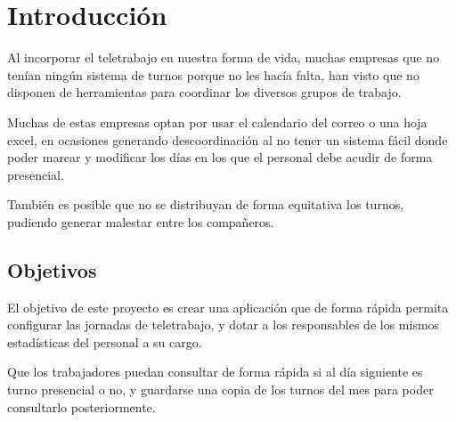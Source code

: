 \documentclass[11pt,spanish,listoffigures,listoftables]{tfgetsinf}
\begin{document}

\mainmatter


\chapter{Introducci\'on}

Al incorporar el teletrabajo en nuestra forma de vida, muchas empresas que no tenían ningún sistema de turnos porque no les hacía falta, han visto que no disponen de herramientas para coordinar los diversos grupos de trabajo.

Muchas de estas empresas optan por usar el calendario del correo o  una hoja excel, en ocasiones generando descoordinación al no tener un sistema fácil donde poder marcar y modificar los días en los que el personal debe acudir de forma presencial.

También es posible que no se distribuyan de forma equitativa los turnos, pudiendo generar malestar entre los compañeros.

%
%
\section{Objetivos}

El objetivo de este proyecto es crear una aplicación que de forma rápida permita configurar las jornadas de teletrabajo, y dotar a los responsables de los mismos estadísticas del personal a su cargo.

Que los trabajadores puedan consultar de forma rápida si al día siguiente es turno presencial o no, y guardarse una copia de los turnos del mes para poder consultarlo posteriormente. 


\end{document}
